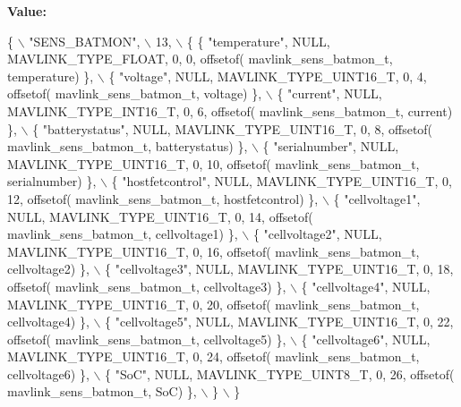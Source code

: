{\bfseries Value\+:}
\begin{DoxyCode}
\{ \(\backslash\)
    \textcolor{stringliteral}{"SENS\_BATMON"}, \(\backslash\)
    13, \(\backslash\)
    \{  \{ \textcolor{stringliteral}{"temperature"}, NULL, MAVLINK_TYPE_FLOAT, 0, 0, offsetof(
      mavlink_sens_batmon_t, temperature) \}, \(\backslash\)
         \{ \textcolor{stringliteral}{"voltage"}, NULL, MAVLINK_TYPE_UINT16_T, 0, 4, offsetof(
      mavlink_sens_batmon_t, voltage) \}, \(\backslash\)
         \{ \textcolor{stringliteral}{"current"}, NULL, MAVLINK_TYPE_INT16_T, 0, 6, offsetof(
      mavlink_sens_batmon_t, current) \}, \(\backslash\)
         \{ \textcolor{stringliteral}{"batterystatus"}, NULL, MAVLINK_TYPE_UINT16_T, 0, 8, offsetof(
      mavlink_sens_batmon_t, batterystatus) \}, \(\backslash\)
         \{ \textcolor{stringliteral}{"serialnumber"}, NULL, MAVLINK_TYPE_UINT16_T, 0, 10, offsetof(
      mavlink_sens_batmon_t, serialnumber) \}, \(\backslash\)
         \{ \textcolor{stringliteral}{"hostfetcontrol"}, NULL, MAVLINK_TYPE_UINT16_T, 0, 12, offsetof(
      mavlink_sens_batmon_t, hostfetcontrol) \}, \(\backslash\)
         \{ \textcolor{stringliteral}{"cellvoltage1"}, NULL, MAVLINK_TYPE_UINT16_T, 0, 14, offsetof(
      mavlink_sens_batmon_t, cellvoltage1) \}, \(\backslash\)
         \{ \textcolor{stringliteral}{"cellvoltage2"}, NULL, MAVLINK_TYPE_UINT16_T, 0, 16, offsetof(
      mavlink_sens_batmon_t, cellvoltage2) \}, \(\backslash\)
         \{ \textcolor{stringliteral}{"cellvoltage3"}, NULL, MAVLINK_TYPE_UINT16_T, 0, 18, offsetof(
      mavlink_sens_batmon_t, cellvoltage3) \}, \(\backslash\)
         \{ \textcolor{stringliteral}{"cellvoltage4"}, NULL, MAVLINK_TYPE_UINT16_T, 0, 20, offsetof(
      mavlink_sens_batmon_t, cellvoltage4) \}, \(\backslash\)
         \{ \textcolor{stringliteral}{"cellvoltage5"}, NULL, MAVLINK_TYPE_UINT16_T, 0, 22, offsetof(
      mavlink_sens_batmon_t, cellvoltage5) \}, \(\backslash\)
         \{ \textcolor{stringliteral}{"cellvoltage6"}, NULL, MAVLINK_TYPE_UINT16_T, 0, 24, offsetof(
      mavlink_sens_batmon_t, cellvoltage6) \}, \(\backslash\)
         \{ \textcolor{stringliteral}{"SoC"}, NULL, MAVLINK_TYPE_UINT8_T, 0, 26, offsetof(
      mavlink_sens_batmon_t, SoC) \}, \(\backslash\)
         \} \(\backslash\)
\}
\end{DoxyCode}
\mbox{\label{mavlink__msg__sens__batmon_8h_a3edbbc6fa4ab36b363e4649eedd01581}} 
